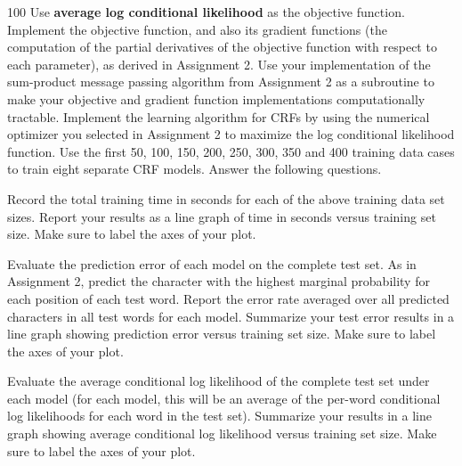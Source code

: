\documentclass[11pt]{article}
\begin{document}
\begin{problem}{100} Use \textbf{average log conditional likelihood} as the objective function. Implement the objective function, and also its gradient functions (the computation of the partial derivatives of the objective function with respect to each parameter), as derived in Assignment 2. Use your implementation of the sum-product message passing algorithm from Assignment 2 as a subroutine to make your objective and gradient function implementations computationally tractable. Implement the learning algorithm for CRFs by using the numerical optimizer you selected in Assignment 2 to maximize the log conditional likelihood function. Use the first 50, 100, 150, 200, 250, 300, 350 and 400 training data cases to train eight separate CRF models. Answer the following questions.

 {Record the total training time in seconds for each of the above training data set sizes. Report your results as a line graph of time in seconds versus training set size. Make sure to label the axes of your plot.}

 {Evaluate the prediction error of each model on the complete test set. As in Assignment 2, predict the character with the highest marginal probability for each position of each test word. Report the error rate averaged over all predicted characters in all test words for each model. Summarize your test error results
in a line graph showing prediction error versus training set size. Make sure to label the axes of your plot.}


 {Evaluate the average conditional log likelihood of the complete test set under each model (for each model, this will be an average of the per-word conditional log likelihoods for each word in the test set). Summarize your results in a line graph showing average conditional log likelihood versus training set
size. Make sure to label the axes of your plot.}

\end{problem}

\showpoints
\end{document}
